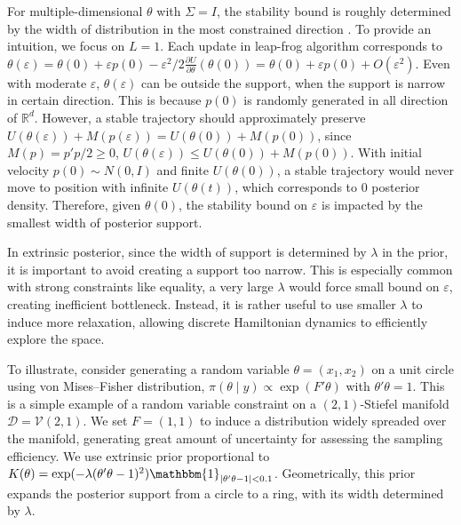 \documentclass[10pt]{article}
\newcommand{\mc}[1]{\mathcal{#1}}
\DeclareMathOperator{\1}{\mathbbm{1}}
\begin{document}
For multiple-dimensional $\theta$ with $\Sigma=I$, the stability bound is roughly determined by the width of distribution in the most constrained direction  \citep{neal2011mcmc}. To provide an intuition, we focus on $L=1$. Each update in leap-frog algorithm corresponds to $\theta(\varepsilon)=\theta(0) + \varepsilon  p(0) - \varepsilon^2/2  \frac{\partial U}{\partial  \theta } ( \theta (0)) = \theta(0) + \varepsilon  p(0) + O(\varepsilon^2)$. Even with moderate $\varepsilon$, $\theta(\varepsilon)$ can be outside the support, when the support is narrow in certain direction. This is because $p(0)$ is randomly generated in all direction of $\mathbb R^d$. However, a stable trajectory should approximately preserve $U(\theta(\varepsilon))+M(p(\varepsilon)) = U(\theta(0))+M(p(0))$, since $M(p)= p'p/2 \ge 0$, $U(\theta(\varepsilon))\le  U(\theta(0))+M(p(0))$. With initial velocity $p(0)\sim N(0, I)$ and finite $U(\theta(0))$, a stable trajectory would never move to position with infinite $U(\theta(t))$, which corresponds to $0$ posterior density. Therefore, given $\theta(0)$, the stability bound on $\varepsilon$ is impacted by the smallest width of posterior support.

In extrinsic posterior, since the width of support is determined by $\lambda$ in the prior, it is important to avoid creating a support too narrow. This is especially common with strong constraints like equality, a very large $\lambda$ would force small bound on $\varepsilon$, creating inefficient bottleneck. Instead, it is rather useful to use smaller $\lambda$ to induce more relaxation, allowing discrete Hamiltonian dynamics to efficiently explore the space.

To illustrate, consider generating a random variable $\theta=(x_1,x_2)$ on a unit circle using von Mises--Fisher distribution, $\pi(\theta \mid y) \propto \exp(F'\theta)$ with $\theta'\theta =1$. This is a simple example of a random variable constraint on a $(2,1)$-Stiefel manifold $\mc D =\mc V(2,1)$. We set $F=(1,1)$ to induce a distribution widely spreaded over the manifold, generating great amount of uncertainty for assessing the sampling efficiency. We use extrinsic prior proportional to $K(\theta)= \exp(-\lambda (\theta'\theta -1)^2) \mathbbm{1}_{|\theta'\theta -1|<0.1}$. Geometrically, this prior expands the posterior support from a circle to a ring, with its width determined by $\lambda$.
\end{document}
